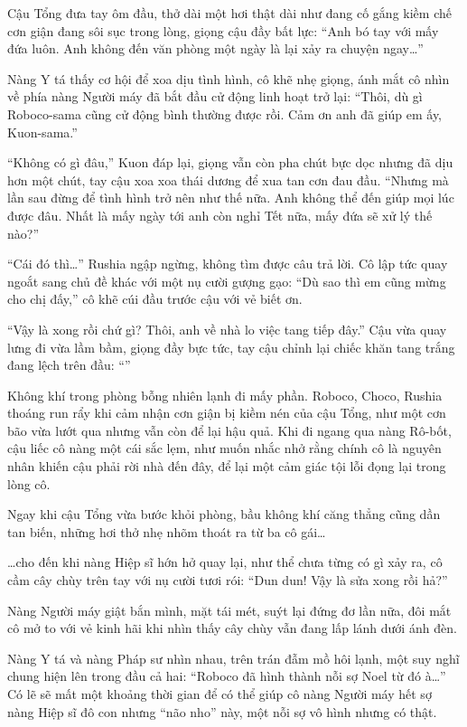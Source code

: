 \documentclass[../main.tex]{subfiles}
\begin{document}
Cậu Tổng đưa tay ôm đầu, thở dài một hơi thật dài như đang cố gắng kiềm chế cơn giận đang sôi sục trong lòng, giọng cậu đầy bất lực: ``Anh bó tay với mấy đứa luôn. Anh không đến văn phòng một ngày là lại xảy ra chuyện ngay\dots''

Nàng Y tá thấy cơ hội để xoa dịu tình hình, cô khẽ nhẹ giọng, ánh mắt cô nhìn về phía nàng Người máy đã bắt đầu cử động linh hoạt trở lại: ``Thôi, dù gì Roboco-sama cũng cử động bình thường được rồi. Cảm ơn anh đã giúp em ấy, Kuon-sama.''

``Không có gì đâu,'' Kuon đáp lại, giọng vẫn còn pha chút bực dọc nhưng đã dịu hơn một chút, tay cậu xoa xoa thái dương để xua tan cơn đau đầu. ``Nhưng mà lần sau đừng để tình hình trở nên như thế nữa. Anh không thể đến giúp mọi lúc được đâu. Nhất là mấy ngày tới anh còn nghỉ Tết nữa, mấy đứa sẽ xử lý thế nào?''

``Cái đó thì\dots'' Rushia ngập ngừng, không tìm được câu trả lời. Cô lập tức quay ngoắt sang chủ đề khác với một nụ cười gượng gạo: ``Dù sao thì em cũng mừng cho chị đấy,'' cô khẽ cúi đầu trước cậu với vẻ biết ơn.

``Vậy là xong rồi chứ gì? Thôi, anh về nhà lo việc tang tiếp đây.'' Cậu vừa quay lưng đi vừa lầm bầm, giọng đầy bực tức, tay cậu chỉnh lại chiếc khăn tang trắng đang lệch trên đầu: ``''

Không khí trong phòng bỗng nhiên lạnh đi mấy phần. Roboco, Choco, Rushia thoáng run rẩy khi cảm nhận cơn giận bị kiềm nén của cậu Tổng, như một cơn bão vừa lướt qua nhưng vẫn còn để lại hậu quả. Khi đi ngang qua nàng Rô-bốt, cậu liếc cô nàng một cái sắc lẹm, như muốn nhắc nhở rằng chính cô là nguyên nhân khiến cậu phải rời nhà đến đây, để lại một cảm giác tội lỗi đọng lại trong lòng cô.

Ngay khi cậu Tổng vừa bước khỏi phòng, bầu không khí căng thẳng cũng dần tan biến, những hơi thở nhẹ nhõm thoát ra từ ba cô gái\dots

\dots cho đến khi nàng Hiệp sĩ hớn hở quay lại, như thể chưa từng có gì xảy ra, cô cầm cây chùy trên tay với nụ cười tươi rói: ``Dun dun! Vậy là sửa xong rồi hả?''

Nàng Người máy giật bắn mình, mặt tái mét, suýt lại đứng đơ lần nữa, đôi mắt cô mở to với vẻ kinh hãi khi nhìn thấy cây chùy vẫn đang lấp lánh dưới ánh đèn.


Nàng Y tá và nàng Pháp sư nhìn nhau, trên trán đẫm mồ hôi lạnh, một suy nghĩ chung hiện lên trong đầu cả hai: ``Roboco đã hình thành nỗi sợ Noel từ đó à\dots'' Có lẽ sẽ mất một khoảng thời gian để có thể giúp cô nàng Người máy hết sợ nàng Hiệp sĩ đô con nhưng ``não nho'' này, một nỗi sợ vô hình nhưng có thật.
\omk
\end{document}
